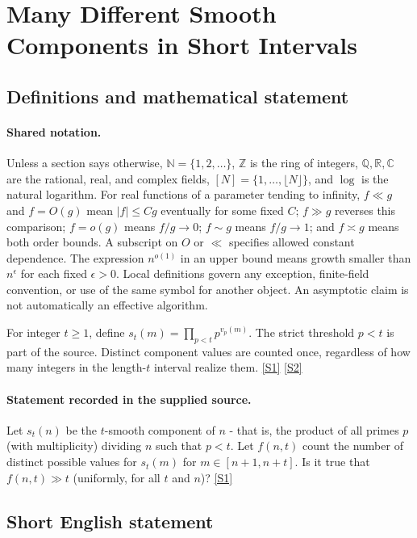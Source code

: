 \documentclass[11pt,a4paper]{article}
\newcommand{\N}{\mathbb{N}}
\newcommand{\Z}{\mathbb{Z}}
\newcommand{\Q}{\mathbb{Q}}
\newcommand{\R}{\mathbb{R}}
\newcommand{\C}{\mathbb{C}}
\newcommand{\sref}[2]{\hyperlink{source:#1:#2}{[S#2]}}
\begin{document}
\section{Many Different Smooth Components in Short Intervals}\label{statement}


\subsection{Definitions and mathematical statement}

\paragraph{Shared notation.}Unless a section says otherwise, $\N=\{1,2,\ldots\}$,
$\Z$ is the ring of integers, $\Q,\R,\C$ are the rational, real, and complex
fields, $[N]=\{1,\ldots,\lfloor N\rfloor\}$, and $\log$ is the natural
logarithm. For real functions of a parameter tending to infinity,
$f\ll g$ and $f=O(g)$ mean $|f|\leq Cg$ eventually for some fixed $C$;
$f\gg g$ reverses this comparison; $f=o(g)$ means $f/g\to0$;
$f\sim g$ means $f/g\to1$; and $f\asymp g$ means both order bounds.
A subscript on $O$ or $\ll$ specifies allowed constant dependence.
The expression $n^{o(1)}$ in an upper bound means growth smaller than
$n^\epsilon$ for each fixed $\epsilon>0$. Local definitions govern any
exception, finite-field convention, or use of the same symbol for another
object. An asymptotic claim is not automatically an effective algorithm.



For integer $t\geq1$, define $s_t(m)=\prod_{p<t}p^{v_p(m)}$. The strict threshold $p<t$ is part of the source. Distinct component values are counted once, regardless of how many integers in the length-$t$ interval realize them. \sref{statement}{1} \sref{statement}{2}

\paragraph{Statement recorded in the supplied source.}
Let $s_t(n)$ be the $t$-smooth component of $n$ - that is, the product of all primes $p$ (with multiplicity) dividing $n$ such that $p<t$. Let $f(n,t)$ count the number of distinct possible values for $s_t(m)$ for $m\in [n+1,n+t]$. Is it true that $ f(n,t)\gg t $ (uniformly, for all $t$ and $n$)? \sref{statement}{1}

\subsection{Short English statement}
\end{document}
